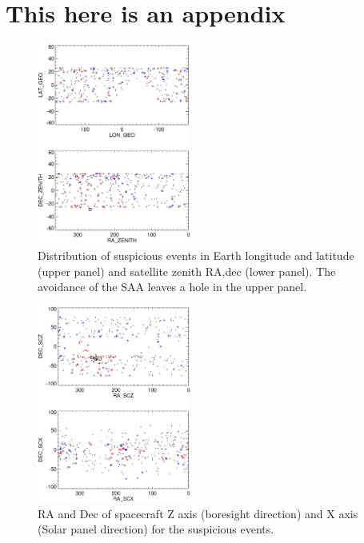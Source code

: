\documentclass[aps,twocolumn,prd,superscriptaddress,showpacs,nofootinbib,fixfloat]{revtex4}
\begin{document}
\appendix
\section{This here is an appendix}


\begin{figure}
\centering
\includegraphics[width=0.45\textwidth]{plots/geo-lonlat.ps}
\caption{Distribution of suspicious events in Earth longitude and latitude
(upper panel) and satellite zenith RA,dec (lower panel).   The
avoidance of the SAA leaves a hole in the upper panel.}
\label{fig:geo-lonlat}
\end{figure}

\begin{figure}
\centering
\includegraphics[width=0.45\textwidth]{plots/spacecraft-zx.ps}
\caption{RA and Dec of spacecraft Z axis (boresight direction) and X axis
(Solar panel direction) for the suspicious events.
}
\label{fig:spacecraft-zx}
\end{figure}
\end{document}
